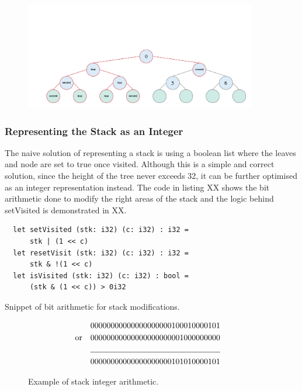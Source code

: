 \begin{figure}[H]
\centering
\includegraphics[width=0.9\textwidth]{pics/kd-tree-visual/11.png}
\caption{}
\end{figure}




\subsubsection{Representing the Stack as an Integer}

The naive solution of representing a stack is using a boolean list where the leaves and node are set to true once visited. Although this is a simple and correct solution, since the height of the tree never exceeds 32, it can be further optimised as an integer representation instead. The code in listing XX shows the bit arithmetic done to modify the right areas of the stack and the logic behind setVisited is demonstrated in XX. 

\begin{listing}[H]
\begin{verbatim}
  let setVisited (stk: i32) (c: i32) : i32 =
      stk | (1 << c)
  let resetVisit (stk: i32) (c: i32) : i32 =
      stk & !(1 << c)
  let isVisited (stk: i32) (c: i32) : bool =
      (stk & (1 << c)) > 0i32
\end{verbatim}
\caption{Snippet of bit arithmetic for stack modifications.}
\label{lst:stack}
\end{listing}

\begin{figure}\label{fig:bits}
\begin{align*}
  && &00000000000000000000100010000101 &\\ \text{or} 
  && &00000000000000000000001000000000 &\\ 
  \cline{3-4}
  && &00000000000000000000101010000101
\end{align*}
\caption{Example of stack integer arithmetic.}
\end{figure}




